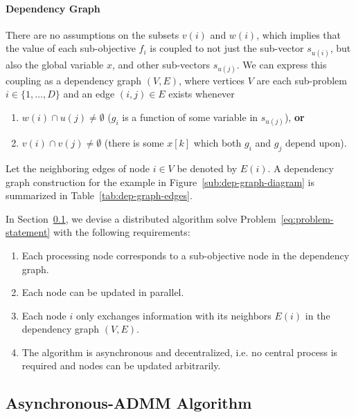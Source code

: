 \paragraph*{Dependency Graph}

There are no assumptions on the subsets $v\left(i\right)$ and $w\left(i\right)$, which implies that the value of each sub-objective $f_i$ is coupled to not just the sub-vector $s_{u\left(i\right)}$, but also the global variable $x$, and other sub-vectors $s_{u\left(j\right)}$. We can express this coupling as a dependency graph $\left(V,E\right)$, where vertices $V$ are each sub-problem $i\in \{1,\ldots, D\} $ and an edge $\left(i,j\right)\in E$ exists whenever

\begin{enumerate}
  \item  $w\left(i\right) \cap u\left(j\right) \neq \emptyset$ ($g_i$ is a function of some variable in $s_{u\left(j\right)}$), \textbf{or}
  \item $v\left(i\right) \cap v\left(j\right) \neq \emptyset$ (there is some $x\left[k\right]$ which both $g_i$ and $g_j$ depend upon).
\end{enumerate}
 
Let the neighboring edges of node $i\in V$ be denoted by $E\left(i\right)$. A dependency graph construction for the example in Figure~\ref{sub:dep-graph-diagram} is summarized in Table~\ref{tab:dep-graph-edges}.

In Section~\ref{sec:algorithm}, we devise a distributed algorithm solve Problem~\eqref{eq:problem-statement} with the following requirements:

\begin{enumerate}
  \item Each processing node corresponds to a sub-objective node in the dependency graph.
  \item Each node can be updated in parallel.
  \item Each node $i$ only exchanges information with its neighbors $E\left(i\right)$ in the dependency graph $\left(V,E\right)$.
  \item The algorithm is asynchronous and decentralized, i.e. no central process is required and nodes can be updated arbitrarily.
\end{enumerate}


\subsection{Asynchronous-ADMM Algorithm} %
\label{sec:algorithm}

